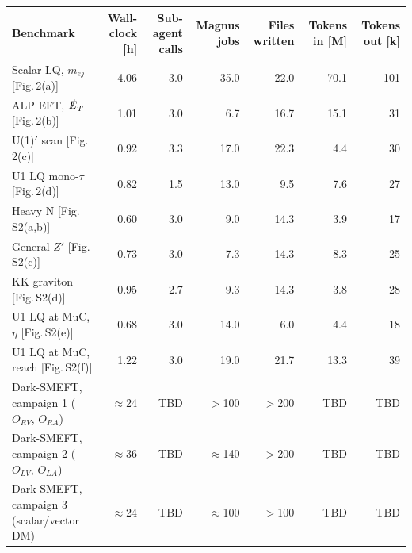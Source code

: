 \begin{tabular}{lrrrrrr}
\toprule
Benchmark & Wall-clock [h] & Sub-agent calls & Magnus jobs & Files written & Tokens in [M] & Tokens out [k] \\
\midrule
Scalar LQ, $m_{ej}$ [Fig.\,2(a)] & 4.06 & 3.0 & 35.0 & 22.0 & 70.1 & 101 \\
ALP EFT, $\slashed{E}_T$ [Fig.\,2(b)] & 1.01 & 3.0 & 6.7 & 16.7 & 15.1 & 31 \\
U(1)$'$ scan [Fig.\,2(c)] & 0.92 & 3.3 & 17.0 & 22.3 & 4.4 & 30 \\
U1 LQ mono-$\tau$ [Fig.\,2(d)] & 0.82 & 1.5 & 13.0 & 9.5 & 7.6 & 27 \\
Heavy N [Fig.\,S2(a,b)] & 0.60 & 3.0 & 9.0 & 14.3 & 3.9 & 17 \\
General $Z'$ [Fig.\,S2(c)] & 0.73 & 3.0 & 7.3 & 14.3 & 8.3 & 25 \\
KK graviton [Fig.\,S2(d)] & 0.95 & 2.7 & 9.3 & 14.3 & 3.8 & 28 \\
U1 LQ at MuC, $\eta$ [Fig.\,S2(e)] & 0.68 & 3.0 & 14.0 & 6.0 & 4.4 & 18 \\
U1 LQ at MuC, reach [Fig.\,S2(f)] & 1.22 & 3.0 & 19.0 & 21.7 & 13.3 & 39 \\
\midrule
Dark-SMEFT, campaign 1 ($O_{RV}$, $O_{RA}$) & $\approx$24 & TBD & $>$100 & $>$200 & TBD & TBD \\
Dark-SMEFT, campaign 2 ($O_{LV}$, $O_{LA}$) & $\approx$36 & TBD & $\approx$140 & $>$200 & TBD & TBD \\
Dark-SMEFT, campaign 3 (scalar/vector DM) & $\approx$24 & TBD & $\approx$100 & $>$100 & TBD & TBD \\
\bottomrule
\end{tabular}

